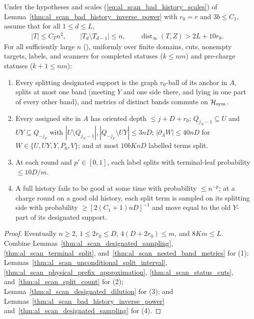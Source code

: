 \begin{lemma}
    \label{thm:al_scan_histories}
    \leanok
    Under the hypotheses and scales (\ref{eq:al_scan_bad_history_scales}) of Lemma~\ref{thm:al_scan_bad_history_inverse_power} with $r_0=r$ and $3b\le C_1$, assume that for all $1\le d\le L$,
    \begin{align}
        |T|\le C_Tn^2,\qquad
        |T_d\setminus T_{d-1}|\le n,\qquad
        \operatorname{dist}_\infty(T,Z)>2L+10r_0.
        \label{eq:al_scan_histories_geom}
    \end{align}
    For all sufficiently large $n$ (\cite[Lemma~9.1]{OpenAI2026AreaLaw}), uniformly over finite domains, cuts, nonempty targets, labels, and scanners for completed statuses ($k\le nm$) and pre-charge statuses ($k+1\le nm$):
    \begin{enumerate}
        \item Every splitting designated support is the graph $r_0$-ball of its anchor in $A$, splits at most one band (meeting $Y$ and one side there, and lying in one part of every other band), and metrics of distinct bands commute on $\mathcal H_{\rm sym}$.
        \item Every assigned site in $A$ has oriented depth $\le j+D+r_0$; $Q_{j_N-1}\subseteq U$ and $UY\subseteq Q_{-j_F}$ with $|U\setminus Q_{j_N-1}|,|Q_{-j_F}\setminus UY|\le 3nD$; $|\partial_\Lambda W|\le 40nD$ for $W\in\{U,UY,Y,P_0,V\}$; and at most $10bKnD$ labelled terms split.
        \item At each round and $p'\in[0,1]$, each label splits with terminal-leaf probability $\le 10D/m$.
        \item A full history fails to be good at some time with probability $\le n^{-p}$; at a charge round on a good old history, each split term is sampled on its splitting side with probability $\ge[2(C_1+1)nD]^{-1}$ and move equal to the old $Y$-part of its designated support.
    \end{enumerate}
\end{lemma}
\begin{proof}\leanok
    Eventually $n\ge2$, $1\le 2r_0\le D$, $4(D+2r_0)\le m$, and $8Km\le L$. Combine Lemmas~\ref{thm:al_scan_designated_sampling}, \ref{thm:al_scan_terminal_split}, and~\ref{thm:al_scan_nested_band_metrics} for (1); Lemmas~\ref{thm:al_scan_unconditional_split_interval}, \ref{thm:al_scan_physical_prefix_approximation}, \ref{thm:al_scan_status_cuts}, and~\ref{thm:al_scan_split_count} for (2); Lemma~\ref{thm:al_scan_designated_dilution} for (3); and Lemmas~\ref{thm:al_scan_bad_history_inverse_power} and~\ref{thm:al_scan_designated_sampling} for (4).
\end{proof}
